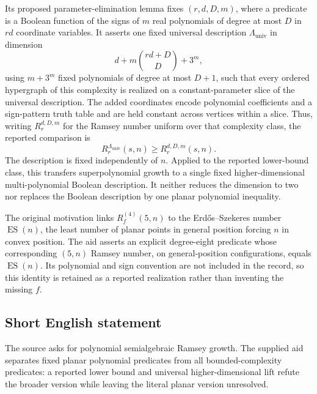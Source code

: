 \documentclass[11pt]{article}
\begin{document}
Its proposed parameter-elimination lemma fixes \((r,d,D,m)\), where a predicate is a Boolean function of the signs of \(m\) real polynomials of degree at most \(D\) in \(rd\) coordinate variables. It asserts one fixed universal description \(\Lambda_{\mathrm{univ}}\) in dimension
\[
 d+m\binom{rd+D}{D}+3^m,
\]
using \(m+3^m\) fixed polynomials of degree at most \(D+1\), such that every ordered hypergraph of this complexity is realized on a constant-parameter slice of the universal description. The added coordinates encode polynomial coefficients and a sign-pattern truth table and are held constant across vertices within a slice. Thus, writing \(R_r^{d,D,m}\) for the Ramsey number uniform over that complexity class, the reported comparison is
\[
 R_r^{\Lambda_{\mathrm{univ}}}(s,n)\ge R_r^{d,D,m}(s,n).
\]
The description is fixed independently of \(n\). Applied to the reported lower-bound class, this transfers superpolynomial growth to a single fixed higher-dimensional multi-polynomial Boolean description. It neither reduces the dimension to two nor replaces the Boolean description by one planar polynomial inequality.

The original motivation links \(R_f^{(4)}(5,n)\) to the Erd\H{o}s--Szekeres number \(\operatorname{ES}(n)\), the least number of planar points in general position forcing \(n\) in convex position. The aid asserts an explicit degree-eight predicate whose corresponding \((5,n)\) Ramsey number, on general-position configurations, equals \(\operatorname{ES}(n)\). Its polynomial and sign convention are not included in the record, so this identity is retained as a reported realization rather than inventing the missing \(f\).
\subsection{Short English statement}
The source asks for polynomial semialgebraic Ramsey growth. The supplied aid separates fixed planar polynomial predicates from all bounded-complexity predicates: a reported lower bound and universal higher-dimensional lift refute the broader version while leaving the literal planar version unresolved.
\end{document}
